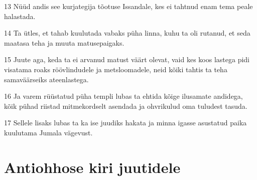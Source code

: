 \par 13 Nüüd andis see kurjategija tõotuse Issandale, kes ei tahtnud enam tema peale halastada.
\par 14 Ta ütles, et tahab kuulutada vabaks püha linna, kuhu ta oli rutanud, et seda maatasa teha ja muuta matusepaigaks.
\par 15 Juute aga, keda ta ei arvanud matust väärt olevat, vaid kes koos lastega pidi visatama roaks röövlindudele ja metsloomadele, neid kõiki tahtis ta teha samaväärseiks ateenlastega.
\par 16 Ja varem rüüstatud püha templi lubas ta ehtida kõige ilusamate andidega, kõik pühad riistad mitmekordselt asendada ja ohvrikulud oma tuludest tasuda.
\par 17 Sellele lisaks lubas ta ka ise juudiks hakata ja minna igasse asustatud paika kuulutama Jumala vägevust.


\section*{Antiohhose kiri juutidele}

